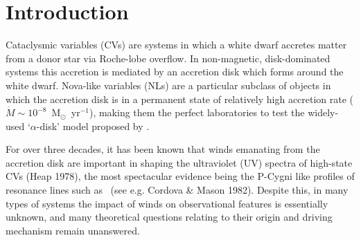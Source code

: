 \documentclass[preprint, a4paper, 11pt]{aastex}
\begin{document}
\maketitle


%
%

\section{Introduction} 


Cataclysmic variables (CVs) are systems in which a white dwarf accretes matter from a donor
star via Roche-lobe overflow. In non-magnetic, disk-dominated systems this accretion
is mediated by an accretion disk which forms around the white dwarf. 
Nova-like variables (NLs) are a particular subclass of objects in which the accretion disk
is in a permanent state of relatively high accretion rate 
($\dot{M} \sim 10^{-8}$~M$_{\odot}$~yr$^{-1}$),
making them the perfect laboratories to test the widely-used 
`$\alpha$-disk' model proposed by 
\cite{shakurasunyaev1973}.

For over three decades, it has been known that winds emanating from the accretion disk
are important in shaping the ultraviolet (UV) spectra of high-state CVs (Heap 1978), 
the most spectacular evidence being the P-Cygni like profiles of resonance lines such as 
\civfull\ (see e.g. Cordova \& Mason 1982\nocite{cordova1982}).
Despite this, in many types of systems the impact of winds on observational
features is essentially unknown, and many theoretical questions relating to their origin 
and driving mechanism remain unanswered.
\end{document}
